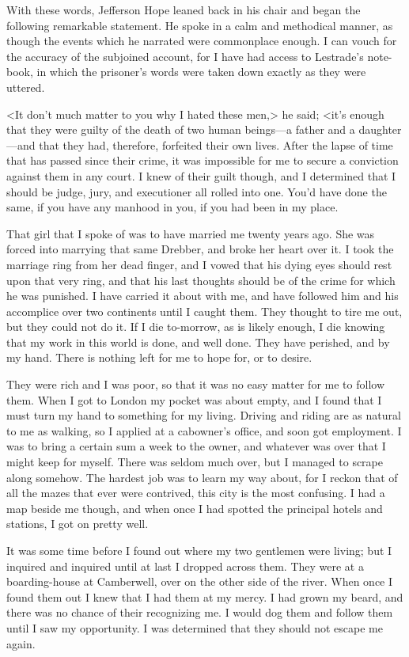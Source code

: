 With these words, Jefferson Hope leaned back in his chair and began the following remarkable statement. He spoke in a calm and methodical manner, as though the events which he narrated were commonplace enough. I can vouch for the accuracy of the subjoined account, for I have had access to Lestrade's note-book, in which the prisoner's words were taken down exactly as they were uttered.

<It don't much matter to you why I hated these men,> he said; <it's enough that they were guilty of the death of two human beings—a father and a daughter—and that they had, therefore, forfeited their own lives. After the lapse of time that has passed since their crime, it was impossible for me to secure a conviction against them in any court. I knew of their guilt though, and I determined that I should be judge, jury, and executioner all rolled into one. You'd have done the same, if you have any manhood in you, if you had been in my place.

That girl that I spoke of was to have married me twenty years ago. She was forced into marrying that same Drebber, and broke her heart over it. I took the marriage ring from her dead finger, and I vowed that his dying eyes should rest upon that very ring, and that his last thoughts should be of the crime for which he was punished. I have carried it about with me, and have followed him and his accomplice over two continents until I caught them. They thought to tire me out, but they could not do it. If I die to-morrow, as is likely enough, I die knowing that my work in this world is done, and well done. They have perished, and by my hand. There is nothing left for me to hope for, or to desire.

They were rich and I was poor, so that it was no easy matter for me to follow them. When I got to London my pocket was about empty, and I found that I must turn my hand to something for my living. Driving and riding are as natural to me as walking, so I applied at a cabowner's office, and soon got employment. I was to bring a certain sum a week to the owner, and whatever was over that I might keep for myself. There was seldom much over, but I managed to scrape along somehow. The hardest job was to learn my way about, for I reckon that of all the mazes that ever were contrived, this city is the most confusing. I had a map beside me though, and when once I had spotted the principal hotels and stations, I got on pretty well.

It was some time before I found out where my two gentlemen were living; but I inquired and inquired until at last I dropped across them. They were at a boarding-house at Camberwell, over on the other side of the river. When once I found them out I knew that I had them at my mercy. I had grown my beard, and there was no chance of their recognizing me. I would dog them and follow them until I saw my opportunity. I was determined that they should not escape me again.

